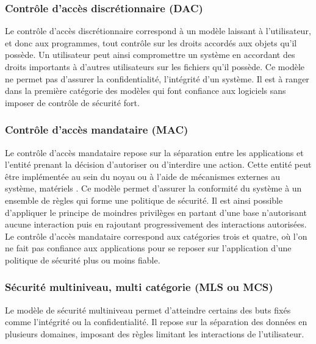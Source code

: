 \subsubsection{Contrôle d'accès discrétionnaire (DAC)}

Le contrôle d'accès discrétionnaire correspond à un modèle laissant à l'utilisateur, et donc aux programmes, tout contrôle sur les droits accordés aux objets qu'il possède. Un utilisateur peut ainsi compromettre un système en accordant des droits importants à d'autres utilisateurs sur les fichiers qu'il possède. Ce modèle ne permet pas d'assurer la confidentialité, l'intégrité d'un système. Il est à ranger dans la première catégorie des modèles qui font confiance aux logiciels sans imposer de contrôle de sécurité fort.

\subsubsection{Contrôle d'accès mandataire (MAC)}

Le contrôle d'accès mandataire repose sur la séparation entre les applications et l'entité prenant la décision d'autoriser ou d'interdire une action. Cette entité peut être implémentée au sein du noyau ou à l'aide de mécanismes externes au système, matériels \cite{ITXT}. Ce modèle permet d'assurer la conformité du système à un ensemble de règles qui forme une politique de sécurité. Il est ainsi possible d'appliquer le principe de moindres privilèges en partant d'une base n'autorisant aucune interaction puis en rajoutant progressivement des interactions autorisées. Le contrôle d'accès mandataire correspond aux catégories trois et quatre, où l'on ne fait pas confiance aux applications pour se reposer sur l'application d'une politique de sécurité plus ou moins fiable.


\subsubsection{Sécurité multiniveau, multi catégorie (MLS ou MCS)}

Le modèle de sécurité multiniveau permet d'atteindre certains des buts fixés comme l'intégrité ou la confidentialité. Il repose sur la séparation des données en plusieurs domaines, imposant des règles limitant les interactions de l'utilisateur.

